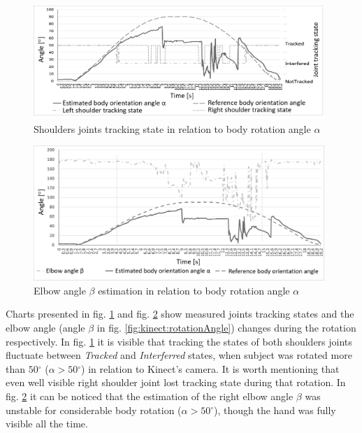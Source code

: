 \documentclass[sensors,article,submit,moreauthors,pdftex,10pt,a4paper]{mdpi}
\newcommand{\degree}{\ensuremath{{}^{\circ}}\xspace}
\begin{document}
\begin{figure}[H] %
	\centering
	\includegraphics[width=11cm]{Figure4.png}
	\caption{Shoulders joints tracking state in relation to body rotation angle $\alpha$}
	\label{fig:kinect:trackingVsAlpha}
\end{figure}
	
\begin{figure}[H] %
	\centering
	\includegraphics[width=11cm]{Figure5.png}
	\caption{Elbow angle $\beta$ estimation in relation to body rotation angle $\alpha$}
	\label{fig:kinect:betaVsAlpha}
\end{figure}
	
Charts presented in fig. \ref{fig:kinect:trackingVsAlpha} and fig. \ref{fig:kinect:betaVsAlpha} show measured joints tracking states and the elbow angle (angle $\beta$ in fig. \ref{fig:kinect:rotationAngle}) changes during the rotation respectively. In fig. \ref{fig:kinect:trackingVsAlpha} it is visible that tracking the states of both shoulders joints fluctuate between \emph{Tracked} and \emph{Interferred} states, when subject was rotated more than $50\degree$ ($\alpha > 50\degree$) in relation to Kinect’s camera. It is worth mentioning that even well visible right shoulder joint lost tracking state during that rotation. In fig. \ref{fig:kinect:betaVsAlpha} it can be noticed that the estimation of the right elbow angle $\beta$ was unstable for considerable body rotation ($\alpha > 50\degree$), though the hand was fully visible all the time.
	
\end{document}
